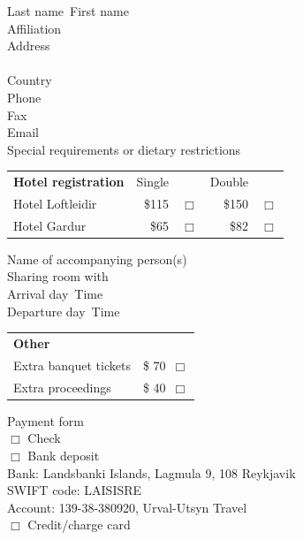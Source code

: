 \addtolength{\baselineskip}{2mm}

Last name\ \dotfill First name\ \dotfill \mbox{} \\
Affiliation\ \dotfill \mbox{} \\
Address\ \dotfill \mbox{} \\
\mbox{} \ \ \ \ \  \dotfill \mbox{} \\
Country\ \dotfill \mbox{} \\
Phone\ \dotfill \mbox{} \\
Fax\ \dotfill \mbox{} \\
Email\ \dotfill \mbox{} \\
Special requirements or dietary restrictions\ \dotfill

\addtolength{\baselineskip}{-2mm}

\vspace{0.2cm}

\begin{tabular}{lrlrl}
{\bf Hotel registration} & Single &	& Double & \\
Hotel Loftleidir	&  \$115 &$\Box$  & \$150 &$\Box$   \\
Hotel Gardur		&  \$65 &$\Box$  & \$82 &$\Box$   \\
\end{tabular}

\vspace{0.2cm}
\addtolength{\baselineskip}{2mm}

Name of accompanying person(s)\ \dotfill \mbox{} \\
Sharing room with\ \dotfill \mbox{} \\
Arrival day\ \dotfill Time\ \dotfill \\
Departure day\ \dotfill Time\ \dotfill

\addtolength{\baselineskip}{-2mm}

\begin{tabular}{lr}
{\bf Other}		& \\
Extra banquet tickets	&  \$ 70\ $\Box$ \\
Extra proceedings       &  \$ 40\ $\Box$
\end{tabular}

\vspace{0.2cm}

Payment form \\
  $\Box$ Check \\
  $\Box$ Bank deposit \\
 \hspace*{2em} Bank: Landsbanki Islands, Lagmula 9, 108 Reykjavik \\
 \hspace*{2em} SWIFT code: LAISISRE \\
 \hspace*{2em} Account: 139-38-380920, Urval-Utsyn Travel \\
  $\Box$ Credit/charge card


